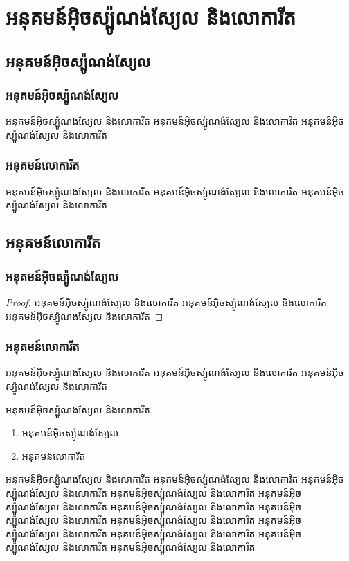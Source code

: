 \documentclass[10pt,a5paper]{yfive}
\begin{document}
	\chapter{អនុគមន៍អ៊ិចស្ប៉ូណង់ស្យែល និងលោការីត}
	\section{អនុគមន៍អ៊ិចស្ប៉ូណង់ស្យែល}
	\subsection{អនុគមន៍អ៊ិចស្ប៉ូណង់ស្យែល}
	\begin{definition}
		អនុគមន៍អ៊ិចស្ប៉ូណង់ស្យែល និងលោការីត អនុគមន៍អ៊ិចស្ប៉ូណង់ស្យែល និងលោការីត អនុគមន៍អ៊ិចស្ប៉ូណង់ស្យែល និងលោការីត
	\end{definition}
	\subsection{អនុគមន៍លោការីត}
	\begin{theorem}
		អនុគមន៍អ៊ិចស្ប៉ូណង់ស្យែល និងលោការីត អនុគមន៍អ៊ិចស្ប៉ូណង់ស្យែល និងលោការីត អនុគមន៍អ៊ិចស្ប៉ូណង់ស្យែល និងលោការីត
	\end{theorem}
	\section{អនុគមន៍លោការីត}
	\subsection{អនុគមន៍អ៊ិចស្ប៉ូណង់ស្យែល}
	\begin{proof}
		អនុគមន៍អ៊ិចស្ប៉ូណង់ស្យែល និងលោការីត អនុគមន៍អ៊ិចស្ប៉ូណង់ស្យែល និងលោការីត អនុគមន៍អ៊ិចស្ប៉ូណង់ស្យែល និងលោការីត
	\end{proof}
	\subsection{អនុគមន៍លោការីត}
	\begin{example}
		អនុគមន៍អ៊ិចស្ប៉ូណង់ស្យែល និងលោការីត អនុគមន៍អ៊ិចស្ប៉ូណង់ស្យែល និងលោការីត អនុគមន៍អ៊ិចស្ប៉ូណង់ស្យែល និងលោការីត
	\end{example}
	\begin{remark}
		អនុគមន៍អ៊ិចស្ប៉ូណង់ស្យែល និងលោការីត
		\begin{enumerate}[k]
			\item អនុគមន៍អ៊ិចស្ប៉ូណង់ស្យែល
			\item អនុគមន៍លោការីត
		\end{enumerate}
		
		អនុគមន៍អ៊ិចស្ប៉ូណង់ស្យែល និងលោការីត អនុគមន៍អ៊ិចស្ប៉ូណង់ស្យែល និងលោការីត អនុគមន៍អ៊ិចស្ប៉ូណង់ស្យែល និងលោការីត
		អនុគមន៍អ៊ិចស្ប៉ូណង់ស្យែល និងលោការីត អនុគមន៍អ៊ិចស្ប៉ូណង់ស្យែល និងលោការីត អនុគមន៍អ៊ិចស្ប៉ូណង់ស្យែល និងលោការីត
		អនុគមន៍អ៊ិចស្ប៉ូណង់ស្យែល និងលោការីត អនុគមន៍អ៊ិចស្ប៉ូណង់ស្យែល និងលោការីត អនុគមន៍អ៊ិចស្ប៉ូណង់ស្យែល និងលោការីត
		អនុគមន៍អ៊ិចស្ប៉ូណង់ស្យែល និងលោការីត អនុគមន៍អ៊ិចស្ប៉ូណង់ស្យែល និងលោការីត អនុគមន៍អ៊ិចស្ប៉ូណង់ស្យែល និងលោការីត
	\end{remark}
\end{document}

